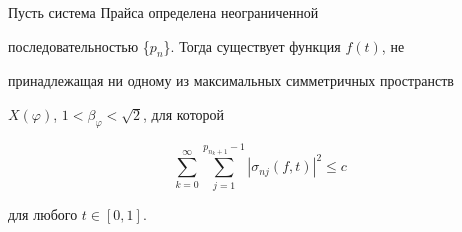 \begin{thm}


Пусть система Прайса определена неограниченной 


последовательностью \{$p_n$\}. Тогда существует функция $f(t)$, не 


принадлежащая ни одному из максимальных симметричных пространств 


$X(\varphi)$, $1<\beta_{\varphi}<\sqrt{2}$, для которой


$$


\sum_{k=0}^{\infty}\sum_{j=1}^{p_{n_k+1}-1}|\sigma_{nj}(f,t)|^{2}\leq c


$$


для любого $t\in[0,1]$.


\end{thm}





